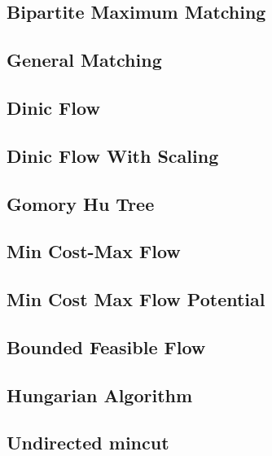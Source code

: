 \subsection{Bipartite Maximum Matching}
\raggedbottom
\hrulefill
\subsection{General Matching}
\raggedbottom
\hrulefill
\subsection{Dinic Flow}
\raggedbottom
\hrulefill
\subsection{Dinic Flow With Scaling}
\raggedbottom
\hrulefill
\subsection{Gomory Hu Tree}
\raggedbottom
\hrulefill
\subsection{Min Cost-Max Flow}
\raggedbottom
\hrulefill
\subsection{Min Cost Max Flow Potential}
\raggedbottom
\hrulefill
\subsection{Bounded Feasible Flow}
\raggedbottom
\hrulefill
\subsection{Hungarian Algorithm}
\raggedbottom
\hrulefill
\subsection{Undirected mincut}
\raggedbottom
\hrulefill
